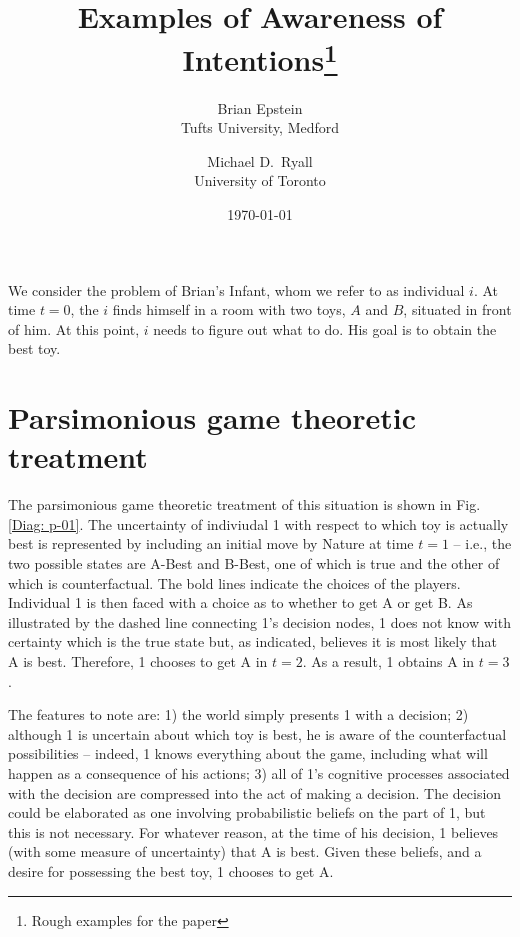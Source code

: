 \documentclass[
11pt,
titlepage,
reqno,
]{article}%
\theoremstyle{definition}
\begin{document}
	
\title
{
	Examples of Awareness of Intentions\thanks{Rough examples for the paper}
}
\author
{
	Brian Epstein \\Tufts University, Medford
	\and 
	Michael D.\ Ryall \\University of Toronto 
}
\date{\today}
\maketitle
	
	
	
\def\baselinestretch{1.5}\small\normalsize
\newcommand{\ra}[1]{\renewcommand{\arraystretch}{#1}}%
\newpage

We consider the problem of Brian's Infant, whom we refer to as individual $i$. At time $t=0$, the $i$ finds himself in a room with two toys, $A$ and $B$, situated in front of him. At this point, $i$ needs to figure out what to do. His goal is to obtain the best toy.  

\section*{Parsimonious game theoretic treatment}
The parsimonious game theoretic treatment of this situation is shown in Fig. \ref{Diag: p-01}. The uncertainty of indiviudal 1 with respect to which toy is actually best is represented by including an initial move by Nature at time $t=1$ -- i.e., the two possible states are A-Best and B-Best, one of which is true and the other of which is counterfactual. The bold lines indicate the choices of the players. Individual 1 is then faced with a choice as to whether to get A or get B. As illustrated by the dashed line connecting 1's decision nodes, 1 does not know with certainty which is the true state but, as indicated, believes it is most likely that A is best. Therefore, 1 chooses to get A in $t=2$. As a result, 1 obtains A in $t=3$.

The features to note are: 1) the world simply presents 1 with a decision; 2) although 1 is uncertain about which toy is best, he is aware of the counterfactual possibilities -- indeed, 1 knows everything about the game, including what will happen as a consequence of his actions; 3) all of 1's cognitive processes associated with the decision are compressed into the act of making a decision. The decision could be elaborated as one involving probabilistic beliefs on the part of 1, but this is not necessary. For whatever reason, at the time of his decision, 1 believes (with some measure of uncertainty) that A is best. Given these beliefs, and a desire for possessing the best toy, 1 chooses to get A.
\end{document}
